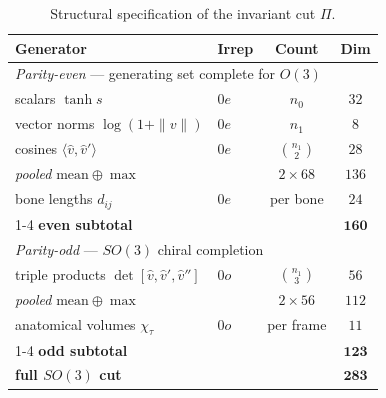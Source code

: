 \documentclass[10pt,twocolumn,letterpaper]{article}
\begin{document}
\begin{table}[t]\centering\footnotesize
\setlength{\tabcolsep}{4pt}
\caption{Structural specification of the invariant cut $\Pi$.}
\label{tab:invsets}
\begin{tabular}{llcc}
\toprule
Generator & Irrep & Count & Dim \\
\midrule
\multicolumn{4}{l}{\emph{Parity-even} --- generating set complete for $O(3)$}\\
\quad scalars $\tanh s$                      & $0e$ & $n_0$            & $32$ \\
\quad vector norms $\log(1{+}\|v\|)$         & $0e$ & $n_1$            & $8$ \\
\quad cosines $\langle\hat v,\hat v'\rangle$ & $0e$ & $\binom{n_1}{2}$ & $28$ \\
\quad\emph{pooled} $\mathrm{mean}\oplus\max$ &      & $2\times68$      & $136$ \\
\quad bone lengths $d_{ij}$                  & $0e$ & per bone         & $24$ \\
\cmidrule(lr){1-4}
\quad\textbf{even subtotal}                  &      &                  & $\mathbf{160}$ \\
\midrule
\multicolumn{4}{l}{\emph{Parity-odd} --- $SO(3)$ chiral completion}\\
\quad triple products $\det[\hat v,\hat v',\hat v'']$ & $0o$ & $\binom{n_1}{3}$ & $56$ \\
\quad\emph{pooled} $\mathrm{mean}\oplus\max$ &      & $2\times56$      & $112$ \\
\quad anatomical volumes $\chi_\tau$         & $0o$ & per frame        & $11$ \\
\cmidrule(lr){1-4}
\quad\textbf{odd subtotal}                   &      &                  & $\mathbf{123}$ \\
\midrule
\quad\textbf{full $SO(3)$ cut}               &      &                  & $\mathbf{283}$ \\
\bottomrule
\end{tabular}
\end{table}

\end{document}
